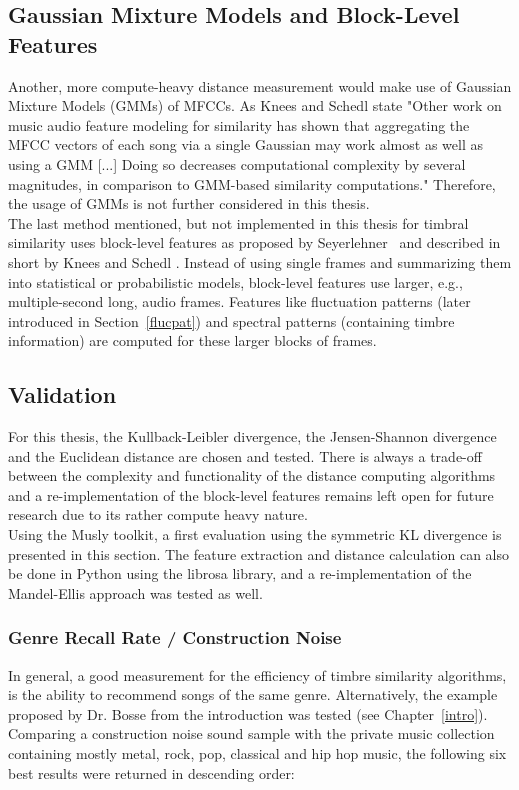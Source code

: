 \subsection{Gaussian Mixture Models and Block-Level Features}\label{blocklevel}
Another, more compute-heavy distance measurement would make use of Gaussian Mixture Models (GMMs) of MFCCs. As Knees and Schedl state "Other work on music audio feature modeling for similarity has shown that aggregating the MFCC vectors of each song via a single Gaussian may work almost as well as using a GMM [...] Doing so decreases computational complexity by several magnitudes, in comparison to GMM-based similarity computations." \cite[p. 65]{knees1} Therefore, the usage of GMMs is not further considered in this thesis.\\
The last method mentioned, but not implemented in this thesis for timbral similarity uses block-level features as proposed by Seyerlehner~\cite{seyerlehnerblock} and described in short by Knees and Schedl \cite[p. 67]{knees1}. Instead of using single frames and summarizing them into statistical or probabilistic models, block-level features use larger, e.g., multiple-second long, audio frames. Features like fluctuation patterns (later introduced in Section~\ref{flucpat}) and spectral patterns (containing timbre information) are computed for these larger blocks of frames. 

\subsection{Validation}

For this thesis, the Kullback-Leibler divergence, the Jensen-Shannon divergence and the Euclidean distance are chosen and tested. There is always a trade-off between the complexity and functionality of the distance computing algorithms and a re-implementation of the block-level features remains left open for future research due to its rather compute heavy nature.\\
Using the Musly toolkit, a first evaluation using the symmetric KL divergence is presented in this section. The feature extraction and distance calculation can also be done in Python using the librosa library, and a re-implementation of the Mandel-Ellis approach was tested as well.\\

\subsubsection{Genre Recall Rate / Construction Noise}
In general, a good measurement for the efficiency of timbre similarity algorithms, is the ability to recommend songs of the same genre. 
Alternatively, the example proposed by Dr. Bosse from the introduction was tested (see Chapter~\ref{intro}). Comparing a construction noise sound sample with the private music collection containing mostly metal, rock, pop, classical and hip hop music, the following six best results were returned in descending order: 

